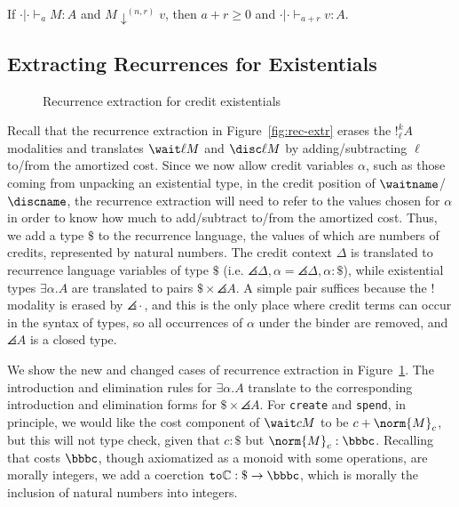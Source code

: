 \begin{theorem}[Preservation]\label{thm:pres-ext}
If $\cdot | \cdot \vdash_a M : A$ and $M \downarrow^{(n,r)} v$, then $a + r \geq 0$ and $\cdot | \cdot \vdash_{a + r} v : A$.
\end{theorem}

\subsection{Extracting Recurrences for Existentials}
\begin{figure}
  
  \caption{Recurrence extraction for credit existentials}
  \label{fig:la-ex}
\end{figure}

Recall that the recurrence extraction in Figure~\ref{fig:rec-extr}
erases the $!^k_\ell A$ modalities and translates $\wait \ell M$ and $\disc \ell M$ by adding/subtracting $\ell$ to/from the amortized cost.
Since we now allow credit variables $\alpha$, such as those coming from unpacking an existential type, in the credit position of $\waitname$/$\discname$, the recurrence extraction will need to refer to the values chosen for $\alpha$ in order to know how much to add/subtract to/from the amortized cost.
Thus, we add a type $\$$ to the recurrence language, the values of which are numbers of credits, represented by natural numbers.  The credit context $\Delta$ is translated to recurrence language variables of type $\$$
(i.e. $\angles{\Delta,\alpha} = \angles{\Delta},\alpha : \$$), while existential types $\exists \alpha.A$ are translated to pairs  $\$ \times \angles{A}$.  A simple pair suffices because the $!$ modality is erased by $\angles{\cdot}$, and this is the only place where credit terms can occur in the syntax of types, so all occurrences of $\alpha$ under the binder are removed, and $\angles{A}$ is a closed type.

We show the new and changed cases of recurrence extraction in Figure~\ref{fig:la-ex}.  The introduction and elimination rules for $\exists \alpha . A$ translate to the corresponding introduction and elimination forms for $\$ \times \angles{A}$.
For \texttt{create} and \texttt{spend}, in principle, we would like the cost component of $\wait c M$ to be $c + \norm{M}_c$, but this will not type check, given that $c : \$$ but $\norm{M}_c : \bbbc$.
Recalling that costs $\bbbc$, though axiomatized as a monoid with some operations, are morally integers, we add a coerction $\texttt{to}\mathbb{C} : \$ \to \bbbc$, which is morally the inclusion of natural numbers into integers.

